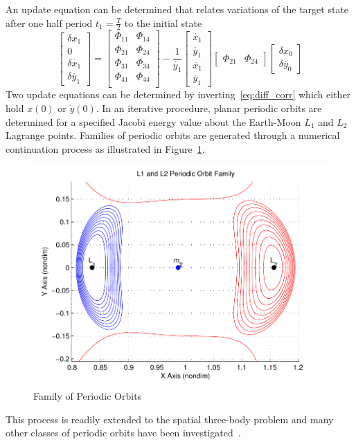 An update equation can be determined that relates variations of the target state after one half period \(t_1 = \frac{T}{2} \) to the initial state
\begin{equation}
	\begin{bmatrix}
		\delta x_1 \\ 0 \\ \delta \dot{x_1} \\ \delta \dot{y_1}
	\end{bmatrix}
	=
	\begin{bmatrix}
		\Phi_{11} & \Phi_{14} \\
		\Phi_{21} & \Phi_{24} \\
		\Phi_{31} & \Phi_{34} \\
		\Phi_{41} & \Phi_{44} \\
	\end{bmatrix}
	- \frac{1}{\dot{y_1}}
	\begin{bmatrix}
		\dot{x_1} \\ \dot{y_1} \\ \ddot{x_1} \\ \ddot{y_1}
	\end{bmatrix}
	\begin{bmatrix}
		\Phi_{21} & \Phi_{24}
	\end{bmatrix}	
	\begin{bmatrix}
		\delta x_0 \\ \delta \dot{y_0}
	\end{bmatrix}
	\label{eq:diff_corr}
\end{equation}
Two update equations can be determined by inverting~\eqref{eq:diff_corr} which either hold \(x(0)\) or \(\dot{y}(0)\).
In an iterative procedure, planar periodic orbits are determined for a specified Jacobi energy value about the Earth-Moon \(L_1\) and \( L_2\) Lagrange points.
Families of periodic orbits are generated through a numerical continuation process as illustrated in Figure~\ref{fig:periodic_family}.
\begin{figure}
	\includegraphics[width = \textwidth]{figures/2015_SSPI/L1L2_periodic_family}
	\caption{Family of Periodic Orbits\label{fig:periodic_family}}
\end{figure}
This process is readily extended to the spatial three-body problem and many other classes of periodic orbits have been investigated~\cite{mains1993,connor-howell1984a,breakwell1979,richardson1980}.
